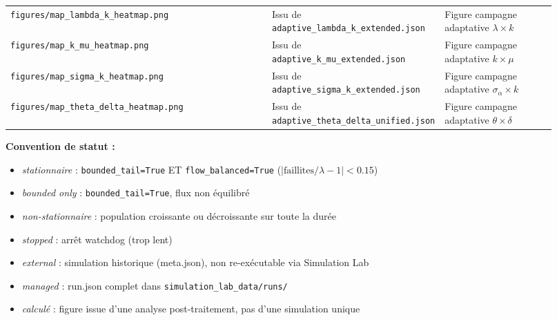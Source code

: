 \begin{longtable}{p{0.50\linewidth}p{0.20\linewidth}p{0.22\linewidth}}
\texttt{figures/map\_lambda\_k\_heatmap.png}
 & Issu de \texttt{adaptive\_lambda\_k\_extended.json}
 & Figure campagne adaptative $\lambda\times k$ \\

\texttt{figures/map\_k\_mu\_heatmap.png}
 & Issu de \texttt{adaptive\_k\_mu\_extended.json}
 & Figure campagne adaptative $k\times\mu$ \\

\texttt{figures/map\_sigma\_k\_heatmap.png}
 & Issu de \texttt{adaptive\_sigma\_k\_extended.json}
 & Figure campagne adaptative $\sigma_\alpha\times k$ \\

\texttt{figures/map\_theta\_delta\_heatmap.png}
 & Issu de \texttt{adaptive\_theta\_delta\_unified.json}
 & Figure campagne adaptative $\theta\times\delta$ \\

\hline
\end{longtable}

\bigskip
\noindent\textbf{Convention de statut :}
\begin{itemize}
  \item \emph{stationnaire} : \texttt{bounded\_tail=True} ET \texttt{flow\_balanced=True} ($|\text{faillites}/\lambda - 1| < 0.15$)
  \item \emph{bounded only} : \texttt{bounded\_tail=True}, flux non équilibré
  \item \emph{non-stationnaire} : population croissante ou décroissante sur toute la durée
  \item \emph{stopped} : arrêt watchdog (trop lent)
  \item \emph{external} : simulation historique (meta.json), non re-exécutable via Simulation Lab
  \item \emph{managed} : run.json complet dans \texttt{simulation\_lab\_data/runs/}
  \item \emph{calculé} : figure issue d'une analyse post-traitement, pas d'une simulation unique
\end{itemize}

